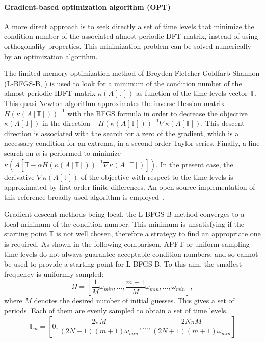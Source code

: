 \paragraph{Gradient-based optimization algorithm (OPT)}
A more direct approach is to seek directly a set of time levels
that minimize the condition number of the associated almost-periodic DFT matrix, 
instead of using orthogonality properties. 
This minimization problem can be solved numerically by 
an optimization algorithm.

The limited memory optimization method of
Broyden-Fletcher-Goldfarb-Shannon (L-BFGS-B, \cite{Byrd1995}) is
used to look for a minimum of the condition number of the
almost-periodic IDFT matrix $\kappa \left(A \left[\mathbb{T} \right]
\right)$ as function of the time levels vector $\mathbb{T}$.  This
quasi-Newton algorithm approximates the inverse Hessian matrix
$H(\kappa \left(A \left[\mathbb{T} \right] \right))^{-1}$ with the
BFGS formula in order to decrease the objective $\kappa \left(A
  \left[\mathbb{T} \right] \right)$ in the direction $-H(\kappa
\left(A \left[\mathbb{T} \right] \right))^{-1}\nabla \kappa \left(A
  \left[\mathbb{T} \right] \right)$.  This descent direction is
associated with the search for a zero of the gradient, which is a
necessary condition for an extrema, in a second order Taylor series.
Finally, a line search on $\alpha$ is performed to minimize $\kappa
\left(A \left[\mathbb{T} - \alpha H(\kappa \left(A \left[\mathbb{T}
      \right] \right))^{-1} \nabla \kappa \left(A \left[\mathbb{T}
      \right] \right) \right] \right)$.  In the present case, the
derivative $\nabla \kappa \left(A \left[\mathbb{T} \right] \right)$ of
the objective with respect to the time levels is approximated by
first-order finite differences.  An open-source implementation of this
reference broadly-used algorithm is
employed~\cite{Nocedal1980}.

Gradient descent methods being local, the L-BFGS-B method converges to a local
minimum of the condition number.  This minimum is unsatisfying if the
starting point $\mathbb{T}$ is not well chosen, therefore a strategy
to find an appropriate one is required.  As shown in the following
comparison, APFT or uniform-sampling time levels do not always
guarantee acceptable condition numbers, and so cannot be used to
provide a starting point for L-BFGS-B. To this aim, the smallest
frequency is uniformly sampled:
\begin{equation}
    \Omega = [\frac{1}{M} \omega_{min}, \ldots, \frac{m+1}{M} \omega_{min}, \ldots, \omega_{min}],
    \label{eq:slitted_period}
\end{equation}
where $M$ denotes the desired number of initial guesses.
This gives a set of periods. Each of them are evenly sampled to obtain a
set of time levels. 
\begin{equation}
    \mathbb{T}_m = \left[ 0, \frac{2 \pi M}{ (2N + 1) (m+1) \omega_{min}}, \ldots, 
                             \frac{2N \pi M}{ (2N + 1) (m+1) \omega_{min}} \right]
    \label{eq:set_of_tlv}
\end{equation}

